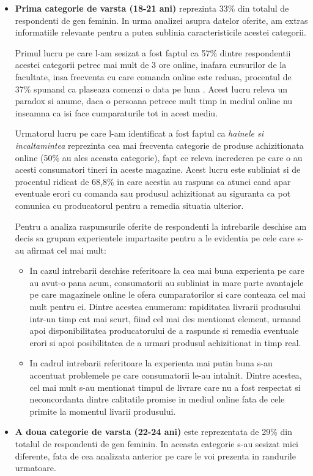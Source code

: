 \documentclass[a4paper, 12pt]{article}
\begin{document}
	\begin{itemize}
		\item \textbf{Prima categorie de varsta (18-21 ani)} reprezinta 33\% din totalul de respondenti de gen feminin. In  urma analizei asupra datelor oferite, am extras informatiile relevante pentru a putea sublinia caracteristicile acestei categorii. 
		
		\quad Primul lucru pe care l-am sesizat a fost faptul ca 57\% dintre respondentii acestei categorii petrec mai mult de 3 ore online, inafara cursurilor de la facultate, insa frecventa cu care comanda online este redusa, procentul de  37\% spunand ca plaseaza comenzi o data pe luna . Acest lucru releva un paradox si anume, daca o persoana petrece mult timp in mediul online nu inseamna ca isi face cumparaturile tot in acest mediu.
		
		\quad Urmatorul lucru pe care l-am identificat a fost faptul ca\textit{ hainele si incaltamintea} reprezinta cea mai frecventa categorie de produse achizitionata online (50\% au ales aceasta categorie),  fapt ce releva increderea pe care o au acesti consumatori tineri in aceste magazine. Acest lucru este subliniat si de procentul ridicat de 68,8\% in care acestia au raspuns ca atunci cand apar eventuale erori cu comanda sau produsul achizitionat au siguranta ca pot comunica cu producatorul pentru a remedia situatia ulterior. 
		
		\quad Pentru a analiza raspunsurile oferite de respondenti la intrebarile deschise am decis sa grupam experientele impartasite pentru a le evidentia pe cele care s-au afirmat cel mai mult:
		\begin{itemize}
			\item In cazul intrebarii deschise referitoare la cea mai buna experienta pe care au avut-o pana acum, consumatorii au subliniat in mare parte avantajele pe care magazinele online le ofera cumparatorilor si care conteaza cel mai mult pentru ei. Dintre acestea enumeram: rapiditatea livrarii produsului intr-un timp cat mai scurt, fiind cel mai des mentionat element, urmand apoi disponibilitatea producatorului de a raspunde si remedia eventuale erori si apoi posibilitatea de a urmari produsul achizitionat in timp real.
			\item 	In cadrul intrebarii referitoare la experienta mai putin buna s-au accentuat problemele pe care consumatorii le-au intalnit. Dintre acestea, cel mai mult s-au mentionat timpul de livrare care nu a fost respectat si neconcordanta dintre calitatile promise in mediul online fata de cele primite la momentul livarii produsului. 
		\end{itemize}
		\item \textbf{A doua categorie de varsta (22-24 ani)} este reprezentata de 29\% din totalul de respondenti de gen feminin. In aceasta categorie s-au sesizat mici diferente, fata de cea analizata anterior pe care le voi prezenta in randurile urmatoare.
		

\end{itemize}
\end{document}
